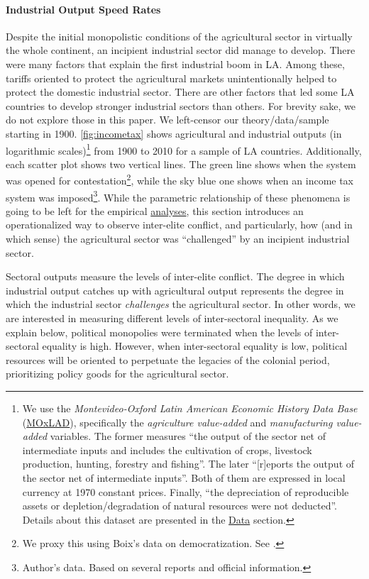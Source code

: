 \documentclass[onesided]{article}\usepackage[]{graphicx}\usepackage[]{color}
\begin{document}
\paragraph{Industrial Output Speed Rates} Despite the initial monopolistic conditions of the agricultural sector in virtually the whole continent, an incipient industrial sector did manage to develop. There were many factors that explain the first industrial boom in LA. Among these, tariffs oriented to protect the agricultural markets unintentionally helped to protect the domestic industrial sector. There are other factors that led some LA countries to develop stronger industrial sectors than others. For brevity sake, we do not explore those in this paper. We left-censor our theory/data/sample starting in 1900. \autoref{fig:incometax} shows agricultural and industrial outputs (in logarithmic scales)\footnote{
	We use the \emph{Montevideo-Oxford Latin American Economic History Data Base}  (\href{http://moxlad-staging.herokuapp.com/home/en?}{MOxLAD}), specifically the \emph{agriculture value-added} and \emph{manufacturing value-added} variables. The former measures ``the output of the sector net of intermediate inputs and includes the cultivation of crops, livestock production, hunting, forestry and fishing''. The later  ``[r]eports the output of the sector net of intermediate inputs''. Both of them are expressed in local currency at 1970 constant prices. Finally, ``the depreciation of reproducible assets or depletion/degradation of natural resources were not deducted''. Details about this dataset are presented in the \hyperref[data]{Data} section.
} from 1900 to 2010 for a sample of LA countries. Additionally, each scatter plot shows two vertical lines. The green line shows when the system was opened for contestation\footnote{
We proxy this using Boix's data on democratization. See \citet[]{Boix2012}.
}, while the sky blue one shows when an income tax system was imposed\footnote{
Author's data. Based on several reports and official information.
}. While the parametric relationship of these phenomena is going to be left for the empirical \hyperref[methods]{analyses}, this section introduces an operationalized way to observe inter-elite conflict, and particularly, how (and in which sense) the agricultural sector was ``challenged'' by an incipient industrial sector.

Sectoral outputs measure the levels of inter-elite conflict. The degree in which industrial output catches up with agricultural output represents the degree in which the industrial sector \emph{challenges} the agricultural sector. In other words, we are interested in measuring different levels of inter-sectoral inequality. As we explain below, political monopolies were terminated when the levels of inter-sectoral equality is high. However, when inter-sectoral equality is low, political resources will be oriented to perpetuate the legacies of the colonial period, prioritizing policy goods for the agricultural sector. 
\end{document}

